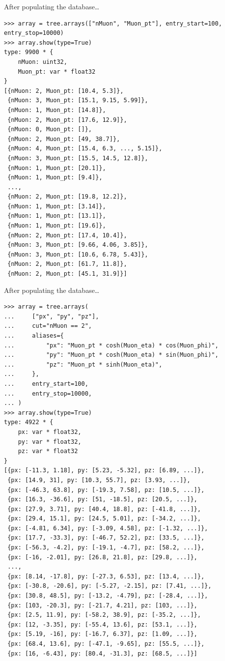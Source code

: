 \documentclass[aspectratio=169]{beamer}
\begin{document}
\begin{frame}[fragile]{After populating the database\ldots}
\vspace{0.32 cm}
\scriptsize
\begin{verbatim}
>>> array = tree.arrays(["nMuon", "Muon_pt"], entry_start=100, entry_stop=10000)
>>> array.show(type=True)
type: 9900 * {
    nMuon: uint32,
    Muon_pt: var * float32
}
[{nMuon: 2, Muon_pt: [10.4, 5.3]},
 {nMuon: 3, Muon_pt: [15.1, 9.15, 5.99]},
 {nMuon: 1, Muon_pt: [14.8]},
 {nMuon: 2, Muon_pt: [17.6, 12.9]},
 {nMuon: 0, Muon_pt: []},
 {nMuon: 2, Muon_pt: [49, 38.7]},
 {nMuon: 4, Muon_pt: [15.4, 6.3, ..., 5.15]},
 {nMuon: 3, Muon_pt: [15.5, 14.5, 12.8]},
 {nMuon: 1, Muon_pt: [20.1]},
 {nMuon: 1, Muon_pt: [9.4]},
 ...,
 {nMuon: 2, Muon_pt: [19.8, 12.2]},
 {nMuon: 1, Muon_pt: [3.14]},
 {nMuon: 1, Muon_pt: [13.1]},
 {nMuon: 1, Muon_pt: [19.6]},
 {nMuon: 2, Muon_pt: [17.4, 10.4]},
 {nMuon: 3, Muon_pt: [9.66, 4.06, 3.85]},
 {nMuon: 3, Muon_pt: [10.6, 6.78, 5.43]},
 {nMuon: 2, Muon_pt: [61.7, 11.8]},
 {nMuon: 2, Muon_pt: [45.1, 31.9]}]
\end{verbatim}
\end{frame}

\begin{frame}[fragile]{After populating the database\ldots}
\vspace{0.32 cm}
\scriptsize
\begin{verbatim}
>>> array = tree.arrays(
...     ["px", "py", "pz"],
...     cut="nMuon == 2",
...     aliases={
...         "px": "Muon_pt * cosh(Muon_eta) * cos(Muon_phi)",
...         "py": "Muon_pt * cosh(Muon_eta) * sin(Muon_phi)",
...         "pz": "Muon_pt * sinh(Muon_eta)",
...     },
...     entry_start=100,
...     entry_stop=10000,
... )
>>> array.show(type=True)
type: 4922 * {
    px: var * float32,
    py: var * float32,
    pz: var * float32
}
[{px: [-11.3, 1.18], py: [5.23, -5.32], pz: [6.89, ...]},
 {px: [14.9, 31], py: [10.3, 55.7], pz: [3.93, ...]},
 {px: [-46.3, 63.8], py: [-19.3, 7.58], pz: [10.5, ...]},
 {px: [16.3, -36.6], py: [51, -18.5], pz: [20.5, ...]},
 {px: [27.9, 3.71], py: [40.4, 18.8], pz: [-41.8, ...]},
 {px: [29.4, 15.1], py: [24.5, 5.01], pz: [-34.2, ...]},
 {px: [-4.81, 6.34], py: [-3.09, 4.58], pz: [-1.32, ...]},
 {px: [17.7, -33.3], py: [-46.7, 52.2], pz: [33.5, ...]},
 {px: [-56.3, -4.2], py: [-19.1, -4.7], pz: [58.2, ...]},
 {px: [-16, -2.01], py: [26.8, 21.8], pz: [29.8, ...]},
 ...,
 {px: [8.14, -17.8], py: [-27.3, 6.53], pz: [13.4, ...]},
 {px: [-30.8, -20.6], py: [-5.27, -2.15], pz: [7.41, ...]},
 {px: [30.8, 48.5], py: [-13.2, -4.79], pz: [-28.4, ...]},
 {px: [103, -20.3], py: [-21.7, 4.21], pz: [103, ...]},
 {px: [2.5, 11.9], py: [-58.2, 38.9], pz: [-35.2, ...]},
 {px: [12, -3.35], py: [-55.4, 13.6], pz: [53.1, ...]},
 {px: [5.19, -16], py: [-16.7, 6.37], pz: [1.09, ...]},
 {px: [68.4, 13.6], py: [-47.1, -9.65], pz: [55.5, ...]},
 {px: [16, -6.43], py: [80.4, -31.3], pz: [68.5, ...]}]
\end{verbatim}
\end{frame}
\end{document}
